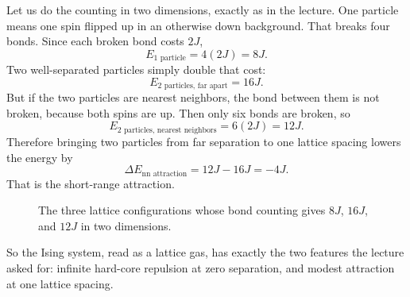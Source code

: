 Let us do the counting in two dimensions, exactly as in the lecture. One particle means one spin flipped up in an otherwise down background. That breaks four bonds. Since each broken bond costs \(2J\),
\begin{equation}
E_{1\text{ particle}}=4(2J)=8J.
\end{equation}
Two well-separated particles simply double that cost:
\begin{equation}
E_{2\text{ particles, far apart}}=16J.
\end{equation}
But if the two particles are nearest neighbors, the bond between them is not broken, because both spins are up. Then only six bonds are broken, so
\begin{equation}
E_{2\text{ particles, nearest neighbors}}=6(2J)=12J.
\end{equation}
Therefore bringing two particles from far separation to one lattice spacing lowers the energy by
\begin{equation}
\Delta E_{\text{nn attraction}}=12J-16J=-4J.
\end{equation}
That is the short-range attraction.

\begin{figure}[t]
\centering
{}
\caption{The three lattice configurations whose bond counting gives \(8J\), \(16J\), and \(12J\) in two dimensions.}
\end{figure}

So the Ising system, read as a lattice gas, has exactly the two features the lecture asked for: infinite hard-core repulsion at zero separation, and modest attraction at one lattice spacing.


